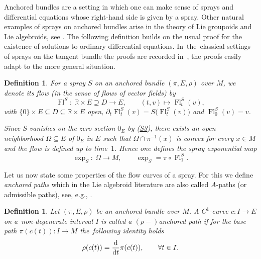 \documentclass[11pt]{article}
\numberwithin{equation}{section}
\numberwithin{equation}{section}
\newtheorem{Definition}[Theorem]{Definition}
\newcommand{\R}{\ensuremath{\mathbb{R}}}
\DeclareMathOperator{\Fl}{Fl}
\begin{document}
Anchored bundles are a setting in which one can make sense of sprays and differential equations whose right-hand side is given by a spray.
Other natural examples of sprays on anchored bundles arise in the theory of Lie groupoids and Lie algebroids, see \cite{CaMaS20,CaF03}.
The following definition builds on the usual proof for the existence of solutions to ordinary differential equations. In~the~classical settings of sprays on the tangent bundle the proofs are recorded in~\mbox{\cite[Chapter~IV, Section~4]{La01}}, the proofs easily adapt to the more general situation.

\begin{Definition}
For a spray $S$ on an anchored bundle $(\pi,E,\rho)$ over $M$, we denote its \emph{flow} (in the sense of flows of vector fields) by{\samepage
\begin{displaymath}
 \Fl^S \colon\ \R \times E \supseteq D \rightarrow E,\qquad (t,v) \mapsto \Fl_t^S (v),\end{displaymath} with $\{0\}\times E \subseteq D\subseteq \R \times E$ open, $\partial_t \Fl_{t}^{S}(v) = S\bigl(\Fl_{t}^{S}(v)\bigr)$ and $\Fl_0^S(v)=v$.}

Since $S$ vanishes on the zero section $0_E$ by (\hyperlink{sprayS3}{S3}), there exists an open neighborhood $\Omega \subseteq E$ of $0_E$ in $E$ such that $\Omega \cap \pi^{-1}(x)$ is convex for every $x \in M$ and the flow is defined up to time~$1$. Hence one defines the \emph{spray exponential map}
\begin{displaymath}\exp_S \colon\ \Omega \rightarrow M,\qquad \exp_S = \pi \circ \Fl^S_1.\end{displaymath}
\end{Definition}

Let us now state some properties of the flow curves of a spray. For this we define \emph{anchored paths} which in the Lie algebroid literature are also called $A$-paths (or admissible paths), see, e.g., \cite[\S1.1]{CaF03}.

\begin{Definition}
Let $(\pi,E,\rho)$ be an anchored bundle over $M$. A $C^1$-curve $c \colon I \rightarrow E$ on a~non-degenerate interval $I$ is called a $(\rho-)$\emph{anchored path} if for the base path $\pi (c(t))\colon I \rightarrow M$ the~following identity holds
\begin{displaymath}\rho(c(t))=\frac{{\rm d}}{{\rm d}t} \pi (c(t)), \qquad \forall t \in I.
\end{displaymath}
\end{Definition}
\end{document}
